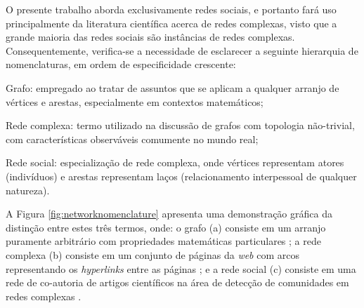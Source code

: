 O presente trabalho aborda exclusivamente redes sociais, e portanto fará uso principalmente da literatura científica acerca de redes complexas, visto que a grande maioria das redes sociais são instâncias de redes complexas. Consequentemente, verifica-se a necessidade de esclarecer a seguinte hierarquia de nomenclaturas, em ordem de especificidade crescente:

\begin{alineas}
    \item Grafo: empregado ao tratar de assuntos que se aplicam a qualquer arranjo de vértices e arestas, especialmente em contextos matemáticos;
    \item Rede complexa: termo utilizado na discussão de grafos com topologia não-trivial, com características observáveis comumente no mundo real;
    \item Rede social: especialização de rede complexa, onde vértices representam atores (indivíduos) e arestas representam laços (relacionamento interpessoal de qualquer natureza).
\end{alineas}

A Figura \ref{fig:networknomenclature} apresenta uma demonstração gráfica da distinção entre estes três termos, onde: o grafo (a) consiste em um arranjo puramente arbitrário com propriedades matemáticas particulares \cite{Bondy1976}; a rede complexa (b) consiste em um conjunto de páginas da \textit{web} com arcos representando os \textit{hyperlinks} entre as páginas \cite{Fortunato2010}; e a rede social (c) consiste em uma rede de co-autoria de artigos científicos na área de detecção de comunidades em redes complexas \cite{Newman2004}.

